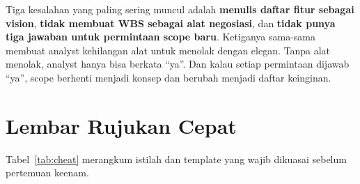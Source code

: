 \documentclass[11pt,a4paper]{article}
\begin{document}
Tiga kesalahan yang paling sering muncul adalah \textbf{menulis daftar fitur sebagai vision}, \textbf{tidak membuat WBS sebagai alat negosiasi}, dan \textbf{tidak punya tiga jawaban untuk permintaan scope baru}. Ketiganya sama-sama membuat analyst kehilangan alat untuk menolak dengan elegan. Tanpa alat menolak, analyst hanya bisa berkata ``ya''. Dan kalau setiap permintaan dijawab ``ya'', scope berhenti menjadi konsep dan berubah menjadi daftar keinginan.

\section{Lembar Rujukan Cepat}

Tabel~\ref{tab:cheat} merangkum istilah dan template yang wajib dikuasai sebelum pertemuan keenam.
\end{document}
